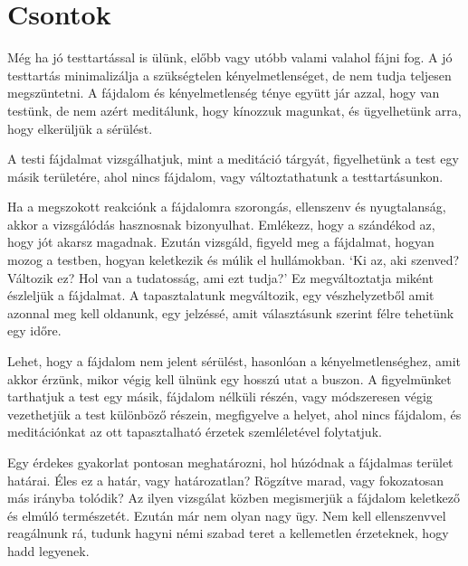 \chapter{Csontok}


\noindent Még ha jó testtartással is ülünk, előbb vagy utóbb valami
valahol fájni fog. A jó testtartás minimalizálja a szükségtelen
kényelmetlenséget, de nem tudja teljesen megszüntetni. A fájdalom és
kényelmetlenség ténye együtt jár azzal, hogy van testünk, de nem azért
meditálunk, hogy kínozzuk magunkat, és ügyelhetünk arra, hogy elkerüljük
a sérülést.

A testi fájdalmat vizsgálhatjuk, mint a meditáció tárgyát, figyelhetünk
a test egy másik területére, ahol nincs fájdalom, vagy változtathatunk a
testtartásunkon.

Ha a megszokott reakciónk a fájdalomra szorongás, ellenszenv és
nyugtalanság, akkor a vizsgálódás hasznosnak bizonyulhat. Emlékezz, hogy
a szándékod az, hogy jót akarsz magadnak. Ezután vizsgáld, figyeld meg a
fájdalmat, hogyan mozog a testben, hogyan keletkezik és múlik el
hullámokban. `Ki az, aki szenved? Változik ez? Hol van a tudatosság, ami
ezt tudja?' Ez megváltoztatja miként észleljük a fájdalmat. A
tapasztalatunk megváltozik, egy vészhelyzetből amit azonnal meg kell
oldanunk, egy jelzéssé, amit választásunk szerint félre tehetünk egy
időre.

\enlargethispage*{\baselineskip}

Lehet, hogy a fájdalom nem jelent sérülést, hasonlóan a
kényelmetlenséghez, amit akkor érzünk, mikor végig kell ülnünk egy
hosszú utat a buszon. A figyelmünket tarthatjuk a test egy
másik, fájdalom nélküli részén, vagy módszeresen végig vezethetjük a
test különböző részein, megfigyelve a helyet, ahol nincs fájdalom, és
meditációnkat az ott tapasztalható érzetek szemléletével folytatjuk.

\clearpage
\null\thispagestyle{empty}%
%
%
\label{illus-standing-meditation}%
\clearpage

Egy érdekes gyakorlat pontosan meghatározni, hol húzódnak a fájdalmas
terület határai. Éles ez a határ, vagy határozatlan? Rögzítve marad,
vagy fokozatosan más irányba tolódik? Az ilyen vizsgálat közben
megismerjük a fájdalom keletkező és elmúló természetét. Ezután már nem
olyan nagy ügy. Nem kell ellenszenvvel reagálnunk rá, tudunk hagyni némi
szabad teret a kellemetlen érzeteknek, hogy hadd legyenek.

